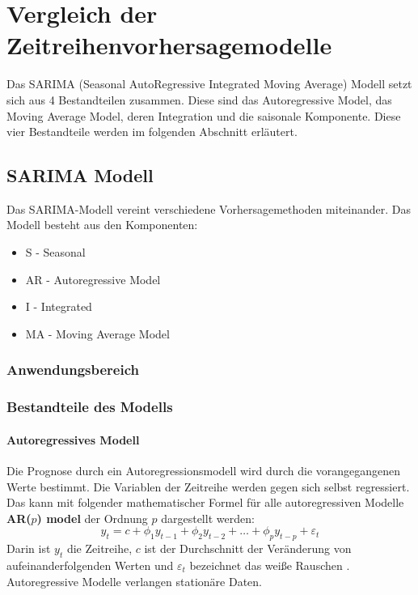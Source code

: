 \documentclass[12pt]{report}
\begin{document}
	\chapter{Vergleich der Zeitreihenvorhersagemodelle}
	Das SARIMA (Seasonal AutoRegressive Integrated Moving Average) Modell setzt sich aus 4 Bestandteilen zusammen. Diese sind das Autoregressive Model, das Moving Average Model, deren Integration und die saisonale Komponente. Diese vier Bestandteile werden im folgenden Abschnitt erläutert.
	\section{SARIMA Modell}
	Das SARIMA-Modell vereint verschiedene Vorhersagemethoden miteinander. Das Modell besteht aus den Komponenten:
	\begin{itemize}
		\item S - Seasonal
		\item AR - Autoregressive Model
		\item I - Integrated
		\item MA - Moving Average Model
	\end{itemize}
	\subsection{Anwendungsbereich}
	
	\subsection{Bestandteile des Modells}
	\subsubsection{Autoregressives Modell}
	Die Prognose durch ein Autoregressionsmodell wird durch die vorangegangenen Werte bestimmt. Die Variablen der Zeitreihe werden gegen sich selbst regressiert. Das kann mit folgender mathematischer Formel für alle autoregressiven Modelle \textbf{AR($p$) model} der Ordnung $p$ dargestellt werden:\\
	\begin{equation}
	y_{t} = c + \phi_{1}y_{t-1} + \phi_{2}y_{t-2} + \dots + \phi_{p}y_{t-p} + \varepsilon_{t}
	\end{equation} 
	Darin ist $y_{t}$ die Zeitreihe, $c$ ist der Durchschnitt der Veränderung von aufeinanderfolgenden Werten und $\varepsilon_{t}$ bezeichnet das weiße Rauschen \cite[Kapitel 8.1, 8.3]{Hyndman.May2018}.\\
	Autoregressive Modelle verlangen stationäre Daten. 
\end{document}
